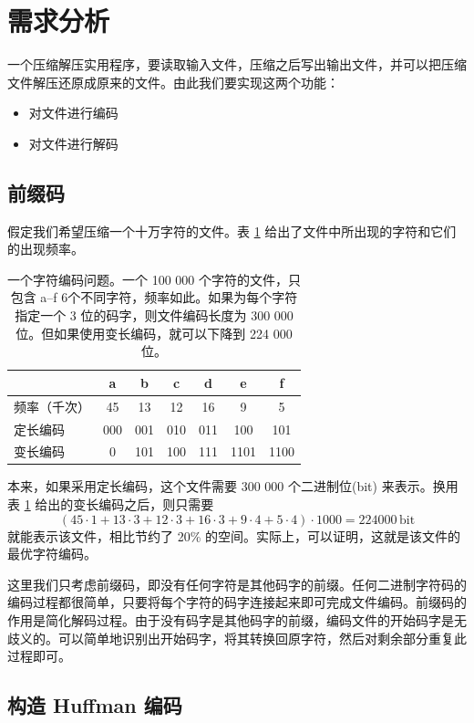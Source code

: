 \section{需求分析}

一个压缩解压实用程序，要读取输入文件，压缩之后写出输出文件，并可以把压缩文件解压还原成原来的文件。由此我们要实现这两个功能：
\begin{itemize}
\item 对文件进行编码
\item 对文件进行解码
\end{itemize}

\subsection{前缀码}

假定我们希望压缩一个十万字符的文件。表 \ref{basetable} 给出了文件中所出现的字符和它们的出现频率。

\begin{table}[h]
\centering
\begin{tabular}{|l|cccccc|}\hline
 & a & b & c & d & e & f \\\hline
频率（千次） & 45 & 13 & 12 & 16 & 9 & 5 \\
定长编码 & 000 & 001 & 010 & 011 & 100 & 101 \\
变长编码 & 0 & 101 & 100 & 111 & 1101 & 1100 \\\hline
\end{tabular}
\caption{\label{basetable}一个字符编码问题。一个 100 000 个字符的文件，只包含 a--f 6个不同字符，频率如此。如果为每个字符指定一个 3 位的码字，则文件编码长度为 300 000 位。但如果使用变长编码，就可以下降到 224 000 位。}
\end{table}

本来，如果采用定长编码，这个文件需要 300 000 个二进制位(bit) 来表示。换用表 \ref{basetable} 给出的变长编码之后，则只需要
\[ (45\cdot 1 + 13\cdot 3 + 12\cdot 3 + 16\cdot 3 + 9\cdot 4 + 5\cdot 4)\cdot 1 000 = 224 000\,{\mathrm{bit}} \]
就能表示该文件，相比节约了 20\% 的空间。实际上，可以证明，这就是该文件的最优字符编码。

这里我们只考虑前缀码，即没有任何字符是其他码字的前缀。任何二进制字符码的编码过程都很简单，只要将每个字符的码字连接起来即可完成文件编码。前缀码的作用是简化解码过程。由于没有码字是其他码字的前缀，编码文件的开始码字是无歧义的。可以简单地识别出开始码字，将其转换回原字符，然后对剩余部分重复此过程即可。

\subsection{构造 Huffman 编码}

